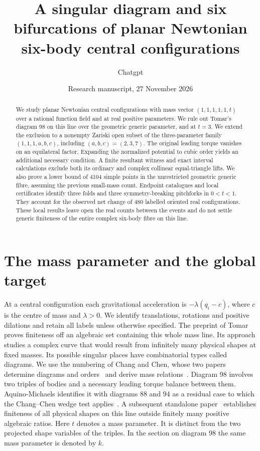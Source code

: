\documentclass[11pt]{article}
\title{A singular diagram and six bifurcations of planar Newtonian six-body central configurations}
\author{Chatgpt}
\date{Research manuscript, 27 November 2026}
\begin{document}
\maketitle
\begin{abstract}
We study planar Newtonian central configurations with mass vector
$(1,1,1,1,1,t)$ over a rational function field and at real positive parameters.
We rule out Tomar's diagram 98 on this line over the geometric generic
parameter, and at $t=3$. We extend the exclusion to a nonempty Zariski open subset of the three-parameter family $(1,1,1,a,b,c)$, including $(a,b,c)=(2,3,7)$. The original leading torque vanishes on an
equilateral factor. Expanding the normalized potential to cubic order
yields an additional necessary condition. A finite resultant witness
and exact interval calculations exclude both its ordinary and complex
collinear equal-triangle lifts. We also prove a lower bound of 4104
simple points in the unrestricted geometric generic fibre, assuming the
previous small-mass count. Endpoint catalogues and local certificates
identify three folds and three symmetry-breaking pitchforks in $0<t<1$.
They account for the observed net change of 480 labelled oriented
real configurations. These local results leave open the real counts between the events and do
not settle generic finiteness of the entire complex six-body fibre on this line.
\end{abstract}
\section{The mass parameter and the global target}
At a central configuration each gravitational acceleration is
$-\lambda(q_i-c)$, where $c$ is the centre of mass and $\lambda>0$.
We identify translations, rotations and positive dilations and retain all
labels unless otherwise specified. The preprint of Tomar~\cite{Tomar}
proves finiteness off an algebraic set containing this whole mass line.
Its approach studies a complex curve that would result from infinitely
many physical shapes at fixed masses. Its possible singular places have
combinatorial types called diagrams. We use the numbering of Chang and
Chen, whose two papers determine diagrams and orders~\cite{CC1} and
derive mass relations~\cite{CC2}. Diagram 98 involves two triples of
bodies and a necessary leading torque balance between them. Aquino-Michaels
identifies it with diagrams 88 and 94 as a residual case to which the
Chang--Chen wedge test applies~\cite{residual}. A subsequent
standalone paper~\cite{realgeneric} establishes finiteness of all
physical shapes on this line outside finitely many positive algebraic ratios.
Here $t$ denotes a mass parameter. It is distinct from the two projected
shape variables of the triples. In the section on diagram 98 the same
mass parameter is denoted by $k$.
\end{document}
